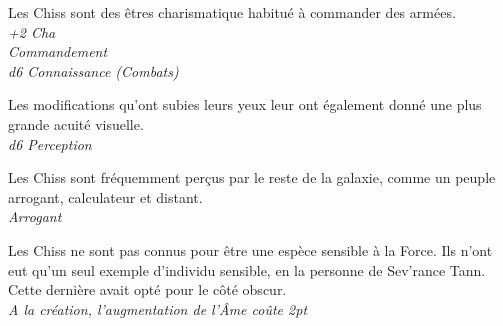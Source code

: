 \begin{description}[align=left]
\item [Charismatique] 			%
		Les Chiss sont des êtres charismatique habitué à commander des armées.\\
		\textit{+2 Cha}\\
		\textit{Commandement}\\
		\textit{d6 Connaissance (Combats)}

\item [Acuité visuelle] 		%
		Les modifications qu’ont subies leurs yeux leur ont également donné une plus grande acuité visuelle.\\
		\textit{d6 Perception}

\item [Arrogant] 				%
		Les Chiss sont fréquemment perçus par le reste de la galaxie, comme un peuple arrogant, calculateur et distant.\\
		\textit{Arrogant}
		
\item [Insensible à la Force] 		%
		Les Chiss ne sont pas connus pour être une espèce sensible à la Force. Ils n’ont eut qu’un seul exemple d’individu sensible, en la personne de Sev’rance Tann. Cette dernière avait opté pour le côté obscur.\\
		\textit{A la création, l’augmentation de l’\^Ame coûte 2pt}
\end{description}